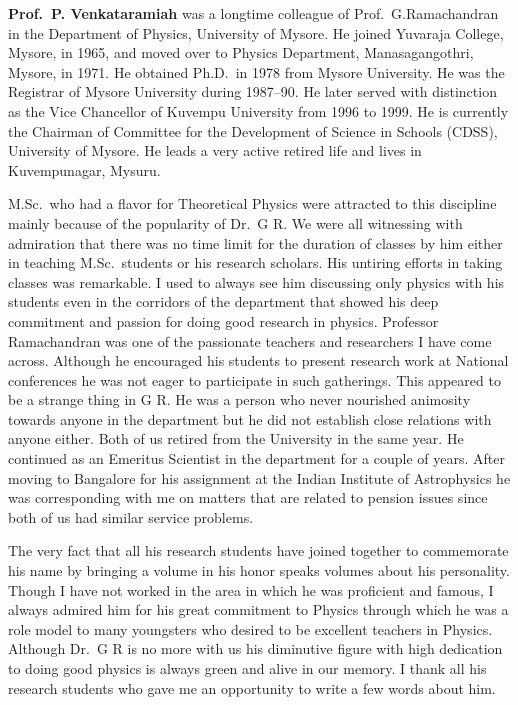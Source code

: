 \noindent
\textbf{Prof.\ P. Venkataramiah} was a longtime colleague of Prof.\ G.\break Ramachandran in the Department of Physics, University of Mysore. He joined Yuvaraja College, Mysore, in 1965, and moved over to Physics Department, Manasagangothri, Mysore, in 1971. He obtained Ph.D.\ in 1978 from Mysore University. He was the Registrar of Mysore University during 1987--90. He later served with distinction as the Vice Chancellor of Kuvempu University from 1996 to 1999. He is currently the Chairman of Committee for the Development of Science in Schools (CDSS), University of Mysore. He leads a very active retired life and lives in Kuvempunagar, Mysuru.
\vfill

\newpage
\noindent
 M.Sc.\ who had a flavor for Theoretical Physics were attracted to this discipline mainly because of the popularity of Dr.\ G R. We were all witnessing with admiration that there was no time limit for the duration of classes by him either in teaching M.Sc.\ students or his research scholars. His untiring efforts in taking classes was remarkable. I used to always see him discussing only physics with his students even in the corridors of the department that showed his deep commitment and passion for doing good research in physics.  Professor Ramachandran was one of the passionate teachers and researchers I have come across. Although he encouraged his students to present research work at National conferences he was not eager to participate in such gatherings. This appeared to be a strange thing in G R.  He was a person who never nourished animosity towards anyone in the department but he did not establish close relations with anyone either. Both of us retired from the University in the same year. He continued as an Emeritus Scientist in the department for a couple of years. After moving to Bangalore for his assignment at the Indian Institute of Astrophysics he was corresponding with me on matters that are related to pension issues since both of us had similar service problems.

The very fact that all his research students have joined together to commemorate his name by bringing a volume in his honor speaks volumes about his personality. Though I have not worked in the area in which he was proficient and famous, I always admired him for his great commitment to Physics through which he was a role model to many youngsters who desired to be excellent teachers in Physics. Although Dr.\ G R is no more with us his diminutive figure with high dedication to doing good physics is always green and alive in our memory. I thank all his research students who gave me an opportunity to write a few words about him.


